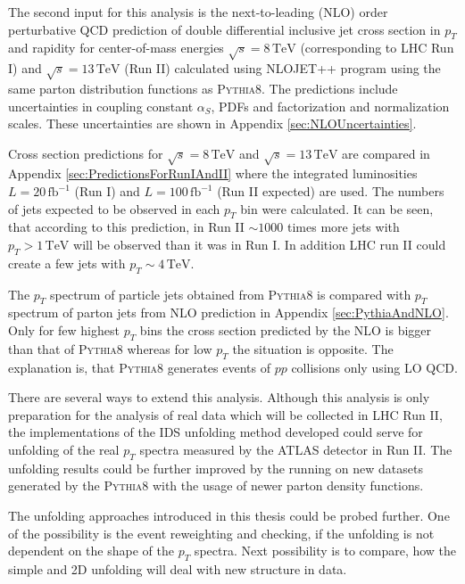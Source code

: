 \documentclass[a4paper,11pt,twoside,openright]{book}
\newcommand{\TeV}{\,\text{TeV}}
\newcommand{\pt}{p_{T}}
\begin{document}
The second input for this analysis is the next-to-leading (NLO) order perturbative QCD
prediction of double differential inclusive jet cross section in $\pt$ and
rapidity for center-of-mass energies $\sqrt{s}=8\TeV$ (corresponding to LHC Run I)
and $\sqrt{s}=13\TeV$ (Run II) calculated using \textsc{NLOJET++} program using
the same parton distribution functions as \textsc{Pythia8}. The predictions
include uncertainties in coupling constant $\alpha_S$, PDFs and
factorization and normalization scales. These uncertainties are
shown in Appendix \ref{sec:NLOUncertainties}.

Cross section predictions for $\sqrt{s}=8\TeV$ and $\sqrt{s}=13\TeV$ are
compared in Appendix \ref{sec:PredictionsForRunIAndII} where the
integrated luminosities $L=20\,\text{fb}^{-1}$ (Run I) and
$L=100\,\text{fb}^{-1}$ (Run II expected) are used. The numbers of jets expected to be
observed in each $\pt$ bin were calculated. It can be seen, that according to
this prediction, in Run II $\sim 1000$ times more jets with $\pt > 1\TeV$ will
be observed than it was in Run I. In addition LHC run II could create a few jets
with $\pt \sim 4 \TeV$.

The $\pt$ spectrum of particle jets obtained from \textsc{Pythia8} is compared with
$\pt$ spectrum of parton jets from NLO prediction in Appendix
\ref{sec:PythiaAndNLO}. Only for few highest $\pt$ bins the cross section
predicted by the NLO is bigger than that of \textsc{Pythia8} whereas for low
$\pt$ the situation is opposite. The explanation is, that \textsc{Pythia8}
generates events of $pp$ collisions only using LO QCD.

There are several ways to extend this analysis. Although this analysis is only
preparation for the analysis of real data which will be collected in LHC Run II,
the implementations of the IDS unfolding method developed could serve for
unfolding of the real $\pt$ spectra measured by the ATLAS detector in Run II.
The unfolding results could be further improved by the running on new datasets
generated by the \textsc{Pythia8} with the usage of newer parton density
functions. 

The unfolding approaches introduced in this thesis could be probed further. One
of the possibility is the event reweighting and checking, if the unfolding is
not dependent on the shape of the $\pt$ spectra. Next possibility is to compare,
how the simple and 2D unfolding will deal with new structure in data.

\end{document}
